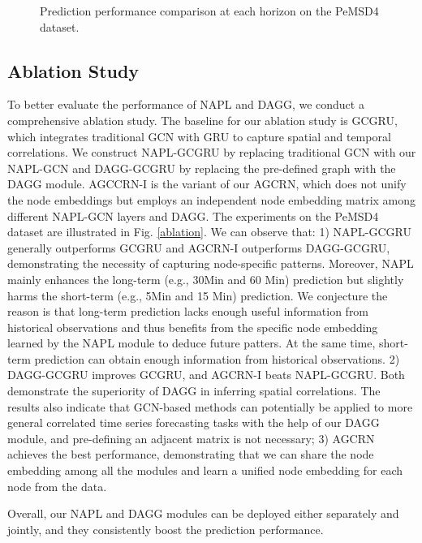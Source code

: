 \documentclass{article}
\begin{document}
\begin{figure}[h]
\centering
{}
\caption{Prediction performance comparison at each horizon on the PeMSD4 dataset.}
\label{pemsd4} 
\end{figure}

\subsection{Ablation Study}
To better evaluate the performance of NAPL and DAGG, we conduct a comprehensive ablation study. The baseline for our ablation study is GCGRU, which integrates traditional GCN with GRU to capture spatial and temporal correlations. We construct NAPL-GCGRU by replacing traditional GCN with our NAPL-GCN and DAGG-GCGRU by replacing the pre-defined graph with the DAGG module. AGCCRN-I is the variant of our AGCRN, which does not unify the node embeddings but employs an independent node embedding matrix among different NAPL-GCN layers and DAGG. The experiments on the PeMSD4 dataset are illustrated in Fig. \ref{ablation}. We can observe that: 1) NAPL-GCGRU generally outperforms GCGRU and AGCRN-I outperforms DAGG-GCGRU, demonstrating the necessity of capturing node-specific patterns. Moreover, NAPL mainly enhances the long-term (e.g., 30Min and 60 Min) prediction but slightly harms the short-term (e.g., 5Min and 15 Min) prediction. We conjecture the reason is that long-term prediction lacks enough useful information from historical observations and thus benefits from the specific node embedding learned by the NAPL module to deduce future patters. At the same time, short-term prediction can obtain enough information from historical observations.
2) DAGG-GCGRU improves GCGRU, and AGCRN-I beats NAPL-GCGRU. Both demonstrate the superiority of DAGG in inferring spatial correlations. The results also indicate that GCN-based methods can potentially be applied to more general correlated time series forecasting tasks with the help of our DAGG module, and pre-defining an adjacent matrix is not necessary; 3) AGCRN achieves the best performance, demonstrating that we can share the node embedding among all the modules and learn a unified node embedding for each node from the data.

Overall, our NAPL and DAGG modules can be deployed either separately and jointly, and they consistently boost the prediction performance.
\end{document}
